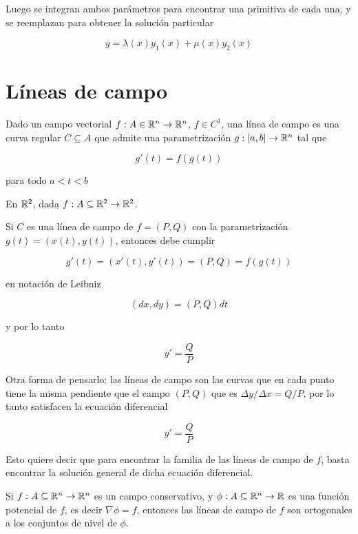 Luego se integran ambos parámetros para encontrar una primitiva de cada una, y se reemplazan para obtener la solución particular

$$ y = \lambda(x) y_1(x) + \mu(x) y_2(x) $$

\section{Líneas de campo}

\begin{definition} 
Dado un campo vectorial $f : A \in \mathbb{R}^n \to \mathbb{R}^n$, $f \in C^1$, una línea de campo es una curva regular $C \subseteq A$ que admite una parametrización $g : [a,b] \to \mathbb{R}^n$ tal que 

$$ g'(t) = f(g(t))$$ 

para todo $ a < t < b$
\end{definition}

\begin{observation} \label{lineas_campo_r2}
En $\mathbb{R}^2$, dada $f : A \subseteq \mathbb{R}^2 \to \mathbb{R}^2$.

Si $C$ es una línea de campo de $f = (P,Q)$ con la parametrización $g(t) = (x(t), y(t))$, entonces debe cumplir

$$g'(t) = (x'(t), y'(t)) = (P,Q) = f(g(t))$$

en notación de Leibniz

$$ (dx,dy) = (P,Q)dt $$

y por lo tanto 

$$y' = \frac{Q}{P}$$

Otra forma de pensarlo:  las líneas de campo son las curvas que en cada punto tiene la misma pendiente que el campo $(P,Q)$ que es $\Delta y / \Delta x = Q/P$, por lo tanto satisfacen la ecuación diferencial

$$y' = \frac{Q}{P}$$

Esto quiere decir que para encontrar la familia de las líneas de campo de $f$, basta encontrar la solución general de dicha ecuación diferencial.
\end{observation}

\begin{theorem} 
Si $f : A \subseteq \mathbb{R}^n \to \mathbb{R}^n$ es un campo conservativo, y $ \phi : A \subseteq \mathbb{R}^n \to \mathbb{R}$ es una función potencial de $f$, es decir $\nabla \phi = f$, entonces las líneas de campo de $f$ son ortogonales a los conjuntos de nivel de $\phi$.
\end{theorem}

